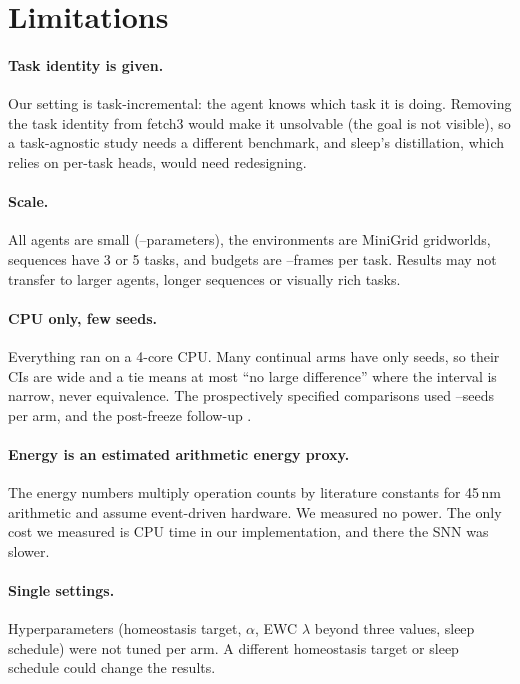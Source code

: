 \documentclass[10pt]{article}
\begin{document}
\section{Limitations}
\label{sec:limitations}

\paragraph{Task identity is given.} Our setting is task-incremental: the agent knows which task it is doing. Removing
the task identity from fetch3 would make it unsolvable (the goal is not visible), so a task-agnostic study needs a
different benchmark, and sleep's distillation, which relies on per-task heads, would need redesigning.

\paragraph{Scale.} All agents are small (\paramsCnnPerTask--\paramsHybridShared parameters), the environments are
MiniGrid gridworlds, sequences have 3 or 5 tasks, and budgets are \framesPerTaskFlat--\framesPerTaskFiveFair frames per
task. Results may not transfer to larger agents, longer sequences or visually rich tasks.

\paragraph{CPU only, few seeds.} Everything ran on a 4-core CPU. Many continual arms have only \nCnnSleep seeds, so their
CIs are wide and a tie means at most ``no large difference'' where the interval is narrow, never equivalence. The
prospectively specified comparisons used \matchN--\rqOneBpN seeds per arm, and the post-freeze follow-up \postN.

\paragraph{Energy is an estimated arithmetic energy proxy.} The energy numbers multiply operation counts by literature
constants for 45\,nm arithmetic and assume event-driven hardware. We measured no power. The only cost we measured is
CPU time in our implementation, and there the SNN was slower.

\paragraph{Single settings.} Hyperparameters (homeostasis target, $\alpha$, EWC $\lambda$ beyond three values, sleep
schedule) were not tuned per arm. A different homeostasis target or sleep schedule could change the results.
\end{document}
